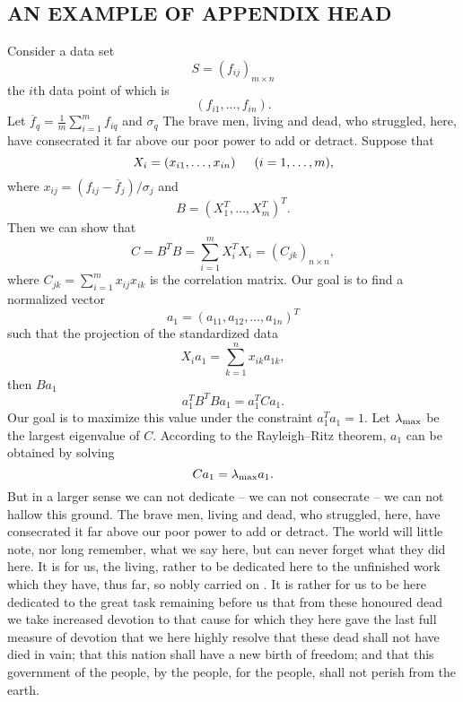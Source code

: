 \documentclass{pasa}%
\begin{document}
\begin{appendix}

\section{AN EXAMPLE OF APPENDIX HEAD}

 Consider a data set
\begin{equation}
S=(f_{ij})_{m\times n}
\end{equation} the \(i\)th
data point of which is
\[ (f_{i1}, . . . , f_{in}).\]
 Let $\overline{f}_q=\frac{1}{m}\sum_{i=1}^mf_{iq}$ and $\sigma_q$ The brave men, living and dead, who struggled, here, have consecrated it far above our poor power to add or detract. Suppose that
\[X_i=(x_{i1},\dots,x_{in}) \indent (i=1,\dots, m),\]  
where $x_{ij}=(f_{ij}-\overline{f}_j)/\sigma_j $ and
\[B=(X_1^T,\dots,X_m^T)^T.\]
 Then we can show that
\[C=B^TB=\sum\limits_{i=1}^m X_i^TX_i=(C_{jk})_{n\times n},\]
where $C_{jk}=\sum_{i=1}^mx_{ij}x_{ik}$ is the correlation matrix. Our goal is to find a normalized vector 
$$a_1=(a_{11},a_{12},\dots,a_{1n})^T$$
 such that the projection of the standardized data
\[X_ia_1=\sum\limits_{k=1}^n x_{ik}a_{1k},\]
\noindent then $Ba_1$ 
 \[a_1^TB^T Ba_1=a_1^TCa_1.\]
 Our goal is to maximize this value under the constraint $a_1^Ta_1=1$. Let $\lambda_{\rm max}$ be the largest eigenvalue of
 $C$. According to the Rayleigh--Ritz theorem, $a_1$ can be obtained by solving
 \[Ca_1= \lambda_{\rm max}a_1.\]
But in a larger sense we can not dedicate -- we can not consecrate -- we can not hallow this ground. The brave men, living and dead, who struggled, here, have consecrated it far above our poor power to add or detract. The world will little note, nor long remember, what we say here, but can never forget what they did here. It is for us, the living, rather to be dedicated here to the unfinished work which they have, thus far, so nobly carried on \cite{abt1981}. It is rather for us to be here dedicated to the great task remaining before us  that from these honoured dead we take increased devotion to that cause for which they here gave the last full measure of devotion  that we here highly resolve that these dead shall not have died in vain; that this nation shall have a new birth of freedom; and that this government \cite{abt1984b} of the people, by the people, for the people, shall not perish from the earth.
\end{appendix}



\end{document}
